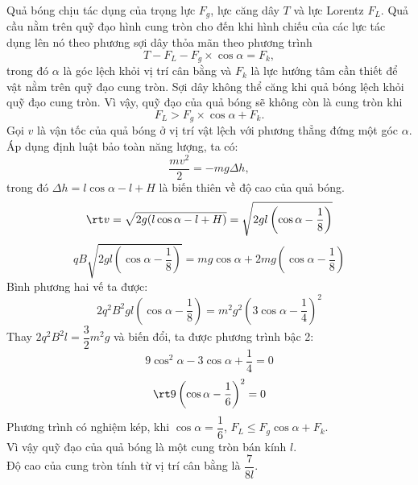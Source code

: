 \begin{loigiai}
Quả bóng chịu tác dụng của trọng lực $F_g$, lực căng dây $T$ và lực Lorentz $F_L$. Quả cầu nằm trên quỹ đạo hình cung tròn cho đến khi hình chiếu của các lực tác dụng lên nó theo phương sợi dây thỏa mãn theo phương trình 
$$T-F_L-F_g \times \cos{\alpha}=F_k,$$
trong đó $\alpha$ là góc lệch khỏi vị trí cân bằng và $F_k$ là lực hướng tâm cần thiết để vật nằm trên quỹ đạo cung tròn. Sợi dây không thể căng khi quả bóng lệch khỏi quỹ đạo cung tròn. Vì vậy, quỹ đạo của quả bóng sẽ không còn là cung tròn khi
$$F_L>F_g \times \cos{\alpha} +F_k.$$
Gọi $v$ là vận tốc của quả bóng ở vị trí vật lệch với phương thẳng đứng một góc $\alpha$.
\\Áp dụng định luật bảo toàn năng lượng, ta có:
$$\dfrac{mv^2}{2}=-mg\Delta h,$$
trong đó $\Delta h=l \cos{\alpha} -l+H$ là biến thiên về độ cao của quả bóng.
$$\rt  v=\sqrt{2g(l \cos{\alpha}-l+H)}=\sqrt{2gl \left(\cos{\alpha}-\dfrac{1}{8}\right)}$$
\[qB\sqrt {2gl\left( {\cos \alpha  - \dfrac{1}{8}} \right)}  = mg\cos \alpha  + 2mg\left( {\cos \alpha  - \dfrac{1}{8}} \right)\]
Bình phương hai vế ta được:
\[2{q^2}{B^2}gl\left( {\cos \alpha  - \dfrac{1}{8}} \right) = {m^2}{g^2}{\left( {3\cos \alpha  - \dfrac{1}{4}} \right)^2}\]
Thay $2q^2B^2l=\dfrac{3}{2}m^2g$ và biến đổi, ta được phương trình bậc 2:
\[9{\cos ^2}\alpha  - 3\cos \alpha  + \dfrac{1}{4} = 0\]
\[\rt 9 \left(\cos{\alpha}-\dfrac{1}{6}\right)^2=0\]
Phương trình có nghiệm kép, khi $\cos{\alpha}=\dfrac{1}{6}$, $F_L \leqslant F_g \cos{\alpha}+F_k$.
\\Vì vậy quỹ đạo của quả bóng là một cung tròn bán kính $l$.
\\Độ cao của cung tròn tính từ vị trí cân bằng là $\dfrac{7}{8l}$.
\end{loigiai}

